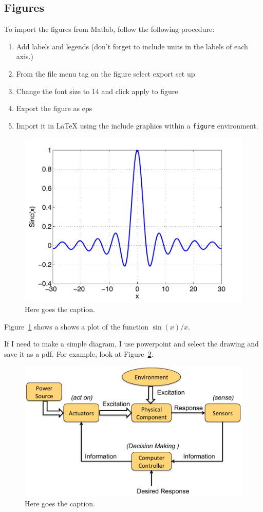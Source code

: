 \documentclass{UoNMCHA}
\numberwithin{equation}{section}
\begin{document}
\subsection{Figures}
To import the figures from Matlab, follow the following procedure:
\begin{enumerate}
    \item Add labels and legends (don't forget to include units in the labels of each axis.)
    \item From the file menu tag on the figure select export set up
    \item Change the font size to 14 and click apply to figure
    \item Export the figure as eps
    \item Import it in LaTeX using the include graphics within a \verb|figure| environment.
\end{enumerate}
%
\begin{figure}[ht]
    \begin{center}
        \includegraphics[width=.6\linewidth]{Figures/SincPlot}
        \caption{Here goes the caption.}
        \label{fig:Sinc}
    \end{center}
\end{figure}
Figure~\ref{fig:Sinc} shows a shows a plot of the function $\sin(x)/x$. 

If I need to make a simple diagram, I use powerpoint and select the drawing and save it as a pdf. For example, look at Figure~\ref{fig:MechaSys}.
\begin{figure}[ht]
    \begin{center}
        \includegraphics[width=.6\linewidth]{Figures/MechaSys}
        \caption{Here goes the caption.}
        \label{fig:MechaSys}
    \end{center}
\end{figure}
\newpage
\end{document}
